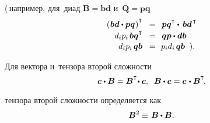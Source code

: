 \begin{otherlanguage}{russian}
\vspace{-0.36em} \noindent (\,например, для~диад ${\bm{B} = \bm{b}\bm{d}}$ и~${\bm{Q} = \bm{p}\bm{q}}$
\vspace{0.1em}\[\begin{array}{rcl}
\left(\hspace{0.1ex} \bm{b}\bm{d} \dotp \bm{p}\bm{q} \hspace{0.1ex}\right)^{\T} & \!=\!\! & \hspace{0.2ex} \bm{p}\bm{q}^{\T} \dotp\hspace{0.4ex} \bm{b}\bm{d}^{\hspace{0.25ex}\T} \\[0.2em]
d_i p_i \hspace{0.32ex} \bm{b}\bm{q}^{\T} & \!=\!\! & \hspace{0.2ex} \bm{q}\bm{p} \dotp \bm{d} \bm{b} \\[0.1em]
d_i p_i \hspace{0.32ex} \bm{q}\bm{b} & \!=\!\! & p_i d_i \hspace{0.32ex} \bm{q}\bm{b} \;\; ).
\end{array}\]

Для вектора и~тензора второй сложности
\begin{equation}\label{vectortensordotproduct}
\bm{c} \dotp \bm{B} = \bm{B}^{\T} \hspace{-0.4ex}\dotp \bm{c} , \;\;
\bm{B} \dotp \bm{c} = \bm{c} \hspace{0.2ex}\dotp \bm{B}^{\T} \hspace{-0.25ex}.
\end{equation}

 тензора второй сложности определяется как
\begin{equation}\label{exponentiation:two}
\bm{B}^2 \equiv\hspace{0.2ex} \bm{B} \dotp \bm{B}.
\end{equation}


\end{otherlanguage}
